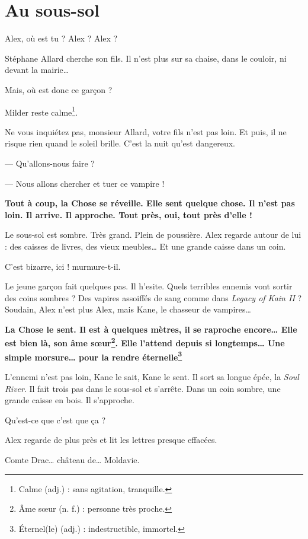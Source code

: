 \chapter{Au sous-sol}
\og Alex, où est tu ? Alex ? Alex ? \fg{}

Stéphane Allard cherche son fils. Il n'est plus sur sa chaise, dans le couloir, ni devant la mairie\ldots{}

\og Mais, où est donc ce gar\c{c}on ? \fg{}

Milder reste calme\footnote{Calme (adj.) : sans agitation, tranquille.}.

\og Ne vous inquiétez pas, monsieur Allard, votre fils n'est pas loin. Et puis, il ne risque rien quand le soleil brille. C'est
la nuit qu'est dangereux.

--- Qu'allons-nous faire ?

--- Nous allons chercher et tuer ce vampire ! \fg{}

\textbf{Tout à coup, la Chose se réveille. Elle sent quelque chose. Il n'est pas loin. Il arrive. Il approche. Tout près, oui,
tout près d'elle !}

Le sous-sol est sombre. Très grand. Plein de poussière. Alex regarde autour de lui : des caisses de livres, des vieux
meubles\ldots{} Et une grande caisse dans un coin.

\og C'est bizarre, ici ! murmure-t-il. \fg{}

Le jeune gar\c{c}on fait quelques pas. Il h'esite. Quels terribles ennemis vont sortir des coins sombres ? Des vapires assoiffés
de sang comme dans \emph{Legacy of Kain II} ? Soudain, Alex n'est plus Alex, mais Kane, le chasseur de vampires\ldots{}

\textbf{La Chose le sent. Il est à quelques mètres, il se raproche encore\ldots{} Elle est bien là, son âme s\oe{}ur\footnote{Âme
s\oe{}ur (n. f.) : personne très proche.}. Elle l'attend depuis si longtemps\ldots{} Une simple morsure\ldots{} pour la rendre
éternelle\footnote{Éternel(le) (adj.) : indestructible, immortel.}}

L'ennemi n'est pas loin, Kane le sait, Kane le sent. Il sort sa longue épée, la \emph{Soul River}. Il fait trois pas dans le
sous-sol et s'arrête. Dans un coin sombre, une grande caisse en bois. Il s'approche.

\og Qu'est-ce que c'est que \c{c}a ? \fg{}

Alex regarde de plus près et lit les lettres presque effacées.

\og Comte Drac\ldots{} château de\ldots{} Moldavie. \fg{}

